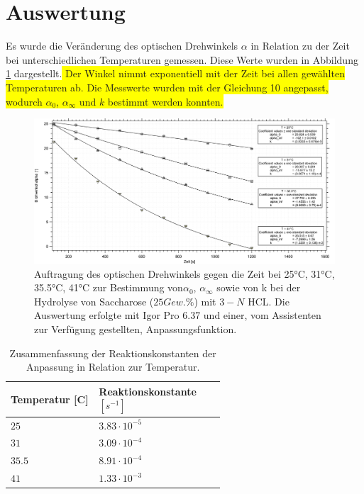 


\section{Auswertung}

Es wurde die Veränderung des optischen Drehwinkels $\alpha$ in Relation zu der Zeit bei unterschiedlichen Temperaturen gemessen. Diese Werte wurden in Abbildung \ref{at} dargestellt.\colorbox{yellow}{ Der Winkel nimmt exponentiell mit der Zeit bei allen gewählten Temperaturen ab. Die Messwerte wurden mit der Gleichung 10 angepasst, wodurch $\alpha_0$, $\alpha_\infty$ und $k$ bestimmt werden konnten.}


\begin{figure}[h]
	\centering	
	\begin{minipage}{1\textwidth}
	\includegraphics[width=\columnwidth]{Bilder/Graph1.png}
	\end{minipage}
		\caption{Auftragung des optischen Drehwinkels gegen die Zeit bei 25°C, 31°C, 35.5°C, 41°C zur Bestimmung von$\alpha_0$, $\alpha_\infty$ sowie von k bei der Hydrolyse von Saccharose ($25 Gew.\%$) mit $3-N$ HCL. Die Auswertung erfolgte mit Igor Pro 6.37 und einer, vom Assistenten zur Verfügung gestellten, Anpassungsfunktion.}
	\label{at}
\end{figure}

\begin{table}[H]
\centering

 
 
 \caption{Zusammenfassung der Reaktionskonstanten der Anpassung  in Relation zur Temperatur.}
\begin{tabular}{L{0.3\linewidth}L{0.3\linewidth}}
Temperatur [\text{\textdegree}C] & Reaktionskonstante $[\si{s}^{-1}]$ \\
\hline \addlinespace[1ex] 
$25$ & $3.83\cdot 10^{-5}$ \\
$31$ & $3.09\cdot 10^{-4}$ \\
$35.5$ & $8.91\cdot 10^{-4}$ \\
$41$ & $1.33\cdot 10^{-3}$ \\
 \end{tabular}
 \label{tab1}
 \end{table}

